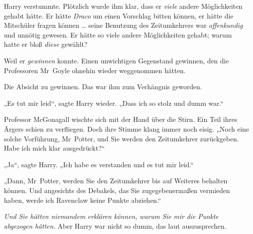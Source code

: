 Harry verstummte. Plötzlich wurde ihm klar, dass er \emph{viele} andere Möglichkeiten gehabt hätte. Er hätte \emph{Draco} um einen Vorschlag bitten können, er hätte die Mitschüler fragen können … seine Benutzung des Zeitumkehrers war \emph{offenkundig} und unnötig gewesen. Er hätte so viele andere Möglichkeiten gehabt; warum hatte er bloß \emph{diese} gewählt?

Weil er \emph{gewinnen} konnte. Einen unwichtigen Gegenstand gewinnen, den die Professoren Mr~Goyle ohnehin wieder weggenommen hätten.

Die Absicht zu gewinnen. Das war ihm zum Verhängnis geworden.

„Es tut mir leid“, sagte Harry wieder.
„Dass ich so stolz und dumm war.“

Professor McGonagall wischte sich mit der Hand über die Stirn. Ein Teil ihres Ärgers schien zu verfliegen. Doch ihre Stimme klang immer noch eisig.
„Noch eine solche Vorführung, Mr~Potter, und Sie werden den Zeitumkehrer zurückgeben. Habe ich mich klar ausgedrückt?“

„Ja“, sagte Harry.
„Ich habe es verstanden und es tut mir leid.“

„Dann, Mr~Potter, werden Sie den Zeitumkehrer bis auf Weiteres behalten können. Und angesichts des Debakels, das Sie zugegebenermaßen vermieden haben, werde ich Ravenclaw keine Punkte abziehen.“

\emph{Und Sie hätten niemandem erklären können, warum Sie mir die Punkte abgezogen hätten.} Aber Harry war nicht so dumm, das laut auszusprechen.

